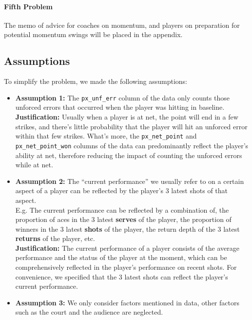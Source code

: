 \paragraph{Fifth Problem}

The memo of advice for coaches on momentum, and players on preparation for potential momentum swings
will be placed in the appendix.

\subsection{Assumptions}

To simplify the problem, we made the following assumptions:

\begin{itemize}
    \item \textbf{Assumption 1:} The \verb|px_unf_err| column of the data only counts those unforced errors that occurred when the player was hitting in baseline.\\
    \textbf{Justification:} Usually when a player is at net, the point will end in a few strikes, and there's little probability that the player will hit an unforced error within that few strikes. What's more, the \verb|px_net_point| and \verb|px_net_point_won| columns of the data can predominantly reflect the player's ability at net, therefore reducing the impact of counting the unforced errors while at net.
    
    \item \textbf{Assumption 2:} The ``current performance'' we usually refer to on a certain aspect of a player can be reflected by the player's 3 latest shots of that aspect.\\
    E.g. The current performance can be reflected by a combination of, the proportion of aces in the 3 latest \textbf{serves} of the player, the proportion of winners in the 3 latest \textbf{shots} of the player, the return depth of the 3 latest \textbf{returns} of the player, etc. \\
    \textbf{Justification:} The current performance of a player consists of the average performance and the status of the player at the moment, which can be comprehensively reflected in the player's performance on recent shots. For convenience, we specified that the 3 latest shots can reflect the player's current performance.

    \item \textbf{Assumption 3:} We only consider factors mentioned in data, 
    other factors such as the court and the audience are neglected.


\end{itemize}
